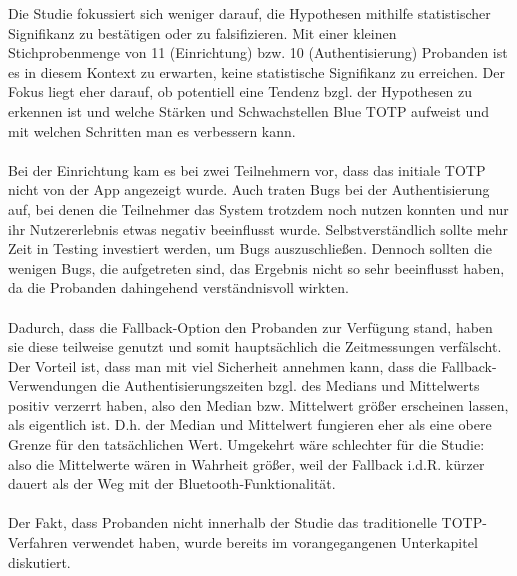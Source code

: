 Die Studie fokussiert sich weniger darauf, die Hypothesen mithilfe 
statistischer Signifikanz zu bestätigen oder zu falsifizieren. Mit einer 
kleinen Stichprobenmenge von 11 (Einrichtung) bzw. 10 (Authentisierung) 
Probanden ist es in diesem Kontext zu erwarten, keine statistische 
Signifikanz zu erreichen. Der Fokus liegt eher darauf, ob potentiell eine 
Tendenz bzgl. der Hypothesen zu erkennen ist und welche Stärken und 
Schwachstellen Blue TOTP aufweist und mit welchen Schritten man es verbessern 
kann.
\\\\
Bei der Einrichtung kam es bei zwei Teilnehmern vor, dass das initiale TOTP 
nicht von der App angezeigt wurde. Auch traten Bugs bei der Authentisierung 
auf, bei denen die Teilnehmer das System trotzdem noch nutzen konnten und nur 
ihr Nutzererlebnis etwas negativ beeinflusst wurde. Selbstverständlich sollte 
mehr Zeit in Testing investiert werden, um Bugs auszuschließen. Dennoch 
sollten die wenigen Bugs, die aufgetreten sind, das Ergebnis nicht so sehr 
beeinflusst haben, da die Probanden dahingehend verständnisvoll wirkten.
\\\\
Dadurch, dass die Fallback-Option den Probanden zur Verfügung stand, haben sie 
diese teilweise genutzt und somit hauptsächlich die Zeitmessungen verfälscht. 
Der Vorteil ist, dass man mit viel Sicherheit annehmen kann, dass die 
Fallback-Verwendungen die Authentisierungszeiten bzgl. des Medians und 
Mittelwerts positiv verzerrt haben, also den Median bzw. Mittelwert größer 
erscheinen lassen, als eigentlich ist. D.h. der Median und Mittelwert 
fungieren eher als eine obere Grenze für den tatsächlichen Wert. Umgekehrt 
wäre schlechter für die Studie: also die Mittelwerte wären in Wahrheit größer, 
weil der Fallback i.d.R. kürzer dauert als der Weg mit der 
Bluetooth-Funktionalität.
\\\\
Der Fakt, dass Probanden nicht innerhalb der Studie das traditionelle TOTP-Verfahren verwendet haben, wurde bereits im vorangegangenen Unterkapitel diskutiert.